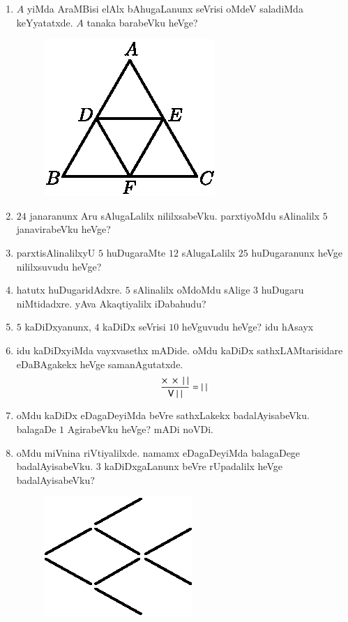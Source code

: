 \begin{enumerate}
\item $A$ yiMda AraMBisi elAlx bAhugaLanunx seVrisi oMdeV saladiMda keYyatatxde. $A$ tanaka barabeVku heVge?
\begin{figure}[H]
\centering
\includegraphics{src/figures/exr34.eps}
\end{figure}

\item $24$ janaranunx Aru sAlugaLalilx nililxsabeVku. parxtiyoMdu sAlinalilx $5$ janavirabeVku heVge?

\item parxtisAlinalilxyU $5$ huDugaraMte $12$ sAlugaLalilx $25$ huDugaranunx heVge nililxsuvudu heVge?

\item hatutx huDugaridAdxre. $5$ sAlinalilx oMdoMdu sAlige $3$ huDugaru niMtidadxre. yAva Akaqtiyalilx iDabahudu?

\item $5$ kaDiDxyanunx, $4$ kaDiDx seVrisi $10$ heVguvudu heVge? idu hAsayx

\item idu kaDiDxyiMda vayxvasethx mADide. oMdu kaDiDx sathxLAMtarisidare eDaBAgakekx heVge samanAgutatxde.
$$
\frac{\times \ \times \ |~|}{{\sf V}~|~|}=|~|
$$

\item oMdu kaDiDx eDagaDeyiMda beVre sathxLakekx badalAyisabeVku. balagaDe $1$ AgirabeVku heVge? mADi noVDi.


\item oMdu miVnina riVtiyalilxde. namamx eDagaDeyiMda balagaDege badalAyisabeVku. $3$ kaDiDxgaLanunx beVre rUpadalilx heVge badalAyisabeVku?
\begin{figure}[H]
\centering
\includegraphics{src/figures/exr41.eps}
\end{figure}


\end{enumerate}

